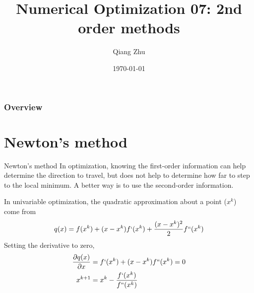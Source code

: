 \documentclass{beamer}
\title[Gradient Descent]{Numerical Optimization 07: 2nd order methods} %
\author{Qiang Zhu} %
\institute[University of Nevada Las Vegas] %
{
University of Nevada Las Vegas\\ %
\medskip
}
\date{\today} %
\begin{document}
\begin{frame}
\titlepage %
\end{frame}

\begin{frame}
\frametitle{Overview} %
\tableofcontents %
\end{frame}



\section{Newton's method}
\begin{frame}{Newton's method}
In optimization, knowing the first-order information can help determine the direction to travel, but does not help to determine how far to step to the local minimum. A better way is to use the second-order information.

In univariable optimization, the quadratic approximation about a point ($x^k$) come from 
\begin{equation*}
    q(x) = f(x^k) + (x-x^k)f`(x^k) + \frac{(x-x^k)^2}{2}f``(x^k)
\end{equation*} 
Setting the derivative to zero, 
\begin{equation*}
\begin{split}
		\frac{\partial q(x)}{\partial x} &= f`(x^k) + (x-x^k)f``(x^k) = 0 \\
		x^{k+1} &= x^k - \frac{f`(x^k)}{f``(x^k)}
\end{split}
\end{equation*}

\end{frame}
\end{document}
